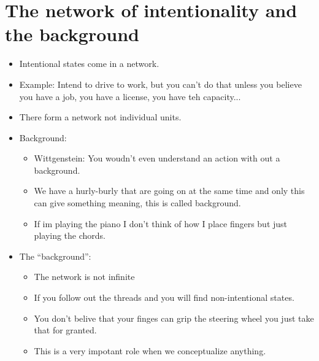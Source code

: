 \section{The network of intentionality and the background}
\begin{itemize}
    \item Intentional states come in a network.
    \item Example: Intend to drive to work, but you can't do that unless you believe you have a job, you have a license, you have teh capacity... 
    \item There form a network not individual units.
    \item Background:   
        \begin{itemize}
            \item Wittgenstein: You woudn't even understand an action with out a background.
            \item We have a hurly-burly that are going on at the same time and only this can give something meaning, this is called background.
            \item If im playing the piano I don't think of how I place fingers but just playing the chords.
        \end{itemize}
    
    \item The ``background'':
        \begin{itemize}
            \item The network is not infinite 
            \item If you follow out the threads and you will find non-intentional states.
            \item You don't belive that your finges can grip the steering wheel you just take that for granted.
            \item This is a very impotant role when we conceptualize anything.
        \end{itemize}
\end{itemize}




